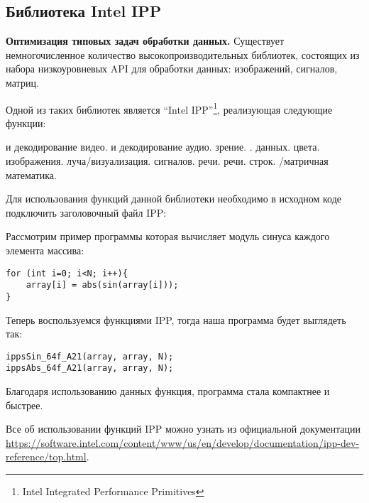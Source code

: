 \subsection{Библиотека Intel IPP}
\label{IPP:section}

\textbf{Оптимизация типовых задач обработки данных.} Существует немногочисленное количество высокопроизводительных библиотек, состоящих из набора низкоуровневых API для обработки данных: изображений, сигналов, матриц.

Одной из таких библиотек является ``Intel IPP''\footnote{Intel Integrated Performance Primitives}, реализующая следующие функции:
\begin{itemize}
     и декодирование видео.
     и декодирование аудио.
     зрение.
    .
     данных.
     цвета.
     изображения.
     луча/визуализация.
     сигналов.
     речи.
     речи.
     строк.
    /матричная математика.
\end{itemize}

Для использования функций данной библиотеки необходимо в исходном коде подключить заголовочный файл IPP: 

Рассмотрим пример программы которая вычисляет модуль синуса каждого элемента массива:

\begin{verbatim}
for (int i=0; i<N; i++){
    array[i] = abs(sin(array[i]));
}
\end{verbatim}

Теперь воспользуемся функциями IPP, тогда наша программа будет выглядеть так:

\begin{verbatim}
ippsSin_64f_A21(array, array, N);
ippsAbs_64f_A21(array, array, N);
\end{verbatim}

Благодаря использованию данных функция, программа стала компактнее и быстрее.

Все об использовании функций IPP можно узнать из официальной документации \url{https://software.intel.com/content/www/us/en/develop/documentation/ipp-dev-reference/top.html}.
